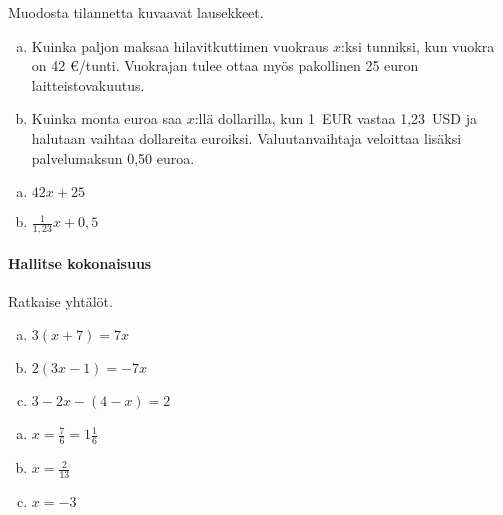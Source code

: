 \begin{tehtava}
    Muodosta tilannetta kuvaavat lausekkeet.
    \begin{enumerate}[(a)]
        \item Kuinka paljon maksaa hilavitkuttimen vuokraus $x$:ksi tunniksi, kun vuokra on 42 \euro /tunti. Vuokrajan tulee ottaa myös pakollinen 25 euron laitteistovakuutus.
        \item Kuinka monta euroa saa $x$:llä dollarilla, kun 1~EUR vastaa 1,23~USD ja halutaan vaihtaa dollareita euroiksi. Valuutanvaihtaja veloittaa lisäksi palvelumaksun 0,50 euroa.
    \end{enumerate}
    \begin{vastaus}
        \begin{enumerate}[(a)]
            \item $42x + 25$
            \item $\frac{1}{1{,}23}x + 0{,}5$
        \end{enumerate}
    \end{vastaus}
\end{tehtava}



\paragraph*{Hallitse kokonaisuus}

\begin{tehtava}
    Ratkaise yhtälöt.
    \begin{enumerate}[(a)]
        \item $3(x+7)=7x$
        \item $2(3x-1)=-7x $
        \item $3-2x-(4-x)=2 $
    \end{enumerate}
    \begin{vastaus}
        \begin{enumerate}[(a)]
            \item $x = \frac{7}{6} =1\frac{1}{6} $
            \item $x = \frac{2}{13}$
            \item $x = -3$
        \end{enumerate}
    \end{vastaus}
\end{tehtava}

